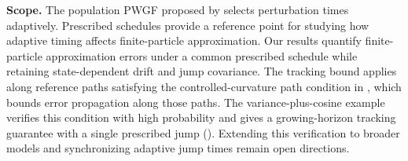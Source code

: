\noindent\textbf{Scope.}
The population PWGF proposed by \citet{yamamoto2025hessianguided}
selects perturbation times adaptively.
Prescribed schedules provide a reference point for studying how adaptive
timing affects finite-particle approximation.
Our results quantify finite-particle approximation errors under a common
prescribed schedule while retaining state-dependent drift and jump covariance.
The tracking bound applies along reference paths satisfying
the controlled-curvature path condition in ,
which bounds error propagation along those paths.
The variance-plus-cosine example verifies this condition with high probability
and gives a growing-horizon tracking guarantee with a single prescribed
jump ().
Extending this verification to broader models and synchronizing adaptive
jump times remain open directions.
